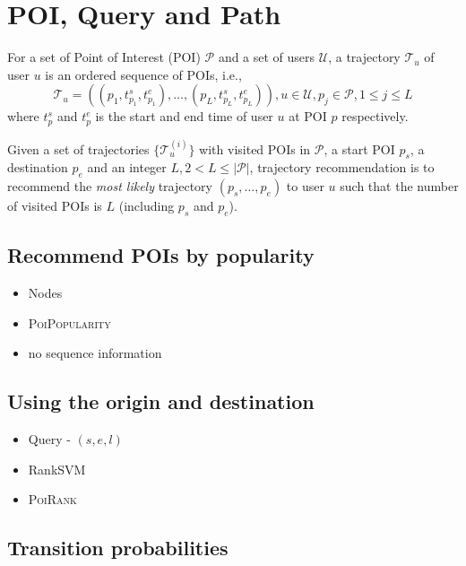 \section{POI, Query and Path}
\label{method}

For a set of Point of Interest (POI) $\mathcal{P}$ and a set of users $\mathcal{U}$,
a trajectory $\mathcal{T}_u$ of user $u$ is an ordered sequence of POIs,
i.e.,
\begin{displaymath}
    \mathcal{T}_u = ((p_1, t_{p_1}^s, t_{p_{1}}^e), \dots, (p_L, t_{p_L}^s, t_{p_L}^e)),
    u \in \mathcal{U},
    p_j \in \mathcal{P}, 1 \le j \le L
\end{displaymath}
where $t_p^s$ and $t_p^e$ is the start and end time of user $u$ at POI $p$ respectively.

Given a set of trajectories $\{ \mathcal{T}_u^{(i)} \}$ with visited POIs in $\mathcal{P}$,
a start POI $p_s$, a destination $p_e$ and an integer $L, 2 < L \le |\mathcal{P}|$,
trajectory recommendation is to recommend the \textit{most likely} trajectory $(p_s, \dots, p_e)$ to user $u$ such that
the number of visited POIs is $L$ (including $p_s$ and $p_e$).


\subsection{Recommend POIs by popularity}

\begin{itemize}
  \item Nodes
  \item \textsc{PoiPopularity}
  \item no sequence information
\end{itemize}

\subsection{Using the origin and destination}

\begin{itemize}
  \item Query - $(s,e,l)$
  \item RankSVM
  \item \textsc{PoiRank}
\end{itemize}

\subsection{Transition probabilities}

